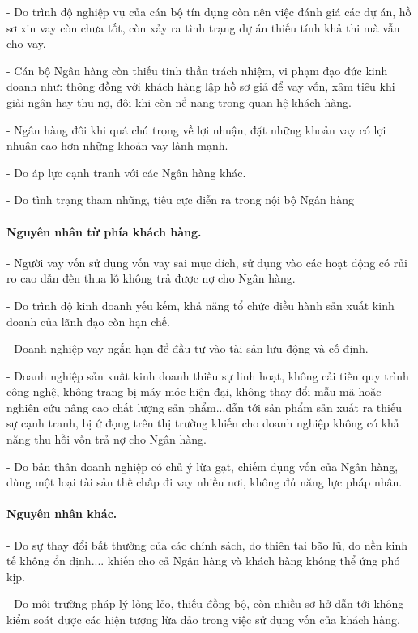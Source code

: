 - Do trình độ nghiệp vụ của cán bộ tín dụng còn nên việc đánh giá các dự án, hồ sơ xin vay còn chưa tốt, còn xảy ra tình trạng dự án thiếu tính khả thi mà vẫn cho vay.

- Cán bộ Ngân hàng còn thiếu tinh thần trách nhiệm, vi phạm đạo đức kinh doanh như: thông đồng với khách hàng lập hồ sơ giả để vay vốn, xâm tiêu khi giải ngân hay thu nợ, đôi khi còn nể nang trong quan hệ khách hàng.

- Ngân hàng đôi khi quá chú trọng về lợi nhuận, đặt những khoản vay có lợi nhuân cao hơn những khoản vay lành mạnh.

- Do áp lực cạnh tranh với các Ngân hàng khác.

- Do tình trạng tham nhũng, tiêu cực diễn ra trong nội bộ Ngân hàng

\paragraph{Nguyên nhân từ phía khách hàng.}

- Người vay vốn sử dụng vốn vay sai mục đích, sử dụng vào các hoạt động có rủi ro cao dẫn đến thua lỗ không trả được nợ cho Ngân hàng.

- Do trình độ kinh doanh yếu kếm, khả năng tổ chức điều hành sản xuất kinh doanh của lãnh đạo còn hạn chế.

- Doanh nghiệp vay ngắn hạn để đầu tư vào tài sản lưu động và cố định.

- Doanh nghiệp sản xuất kinh doanh thiếu sự linh hoạt, không cải tiến quy trình công nghệ, không trang bị máy móc hiện đại, không thay đổi mẫu mã hoặc nghiên cứu nâng cao chất lượng sản phẩm...dẫn tới sản phẩm sản xuất ra thiếu sự cạnh tranh, bị ứ đọng trên thị trường khiến cho doanh nghiệp không có khả năng thu hồi vốn trả nợ cho Ngân hàng.

- Do bản thân doanh nghiệp có chủ ý lừa gạt, chiếm dụng vốn của Ngân hàng, dùng một loại tài sản thế chấp đi vay nhiều nơi, không đủ năng lực pháp nhân.

\paragraph{Nguyên nhân khác.}

- Do sự thay đổi bất thường của các chính sách, do thiên tai bão lũ, do nền kinh tế không ổn định.... khiến cho cả Ngân hàng và khách hàng không thể ứng phó kịp.

- Do môi trường pháp lý lỏng lẻo, thiếu đồng bộ, còn nhiều sơ hở dẫn tới không kiểm soát được các hiện tượng lừa đảo trong việc sử dụng vốn của khách hàng.

